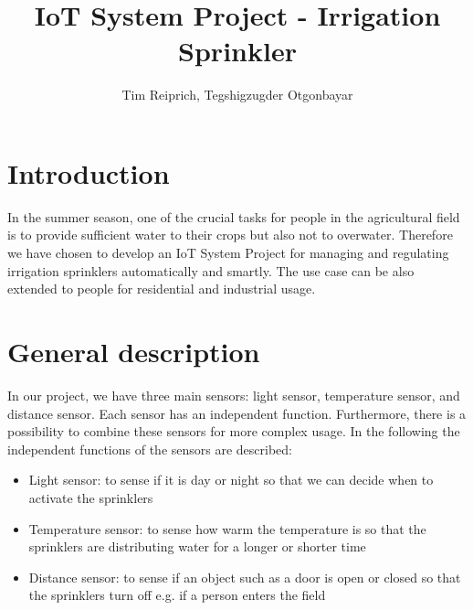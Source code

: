 \documentclass{article}
\title{IoT System Project - Irrigation Sprinkler}
\author{Tim Reiprich, Tegshigzugder Otgonbayar}
\begin{document}
\pagestyle{plain}  %

\maketitle


\newpage

\tableofcontents %
\newpage

\section{Introduction}
In the summer season, one of the crucial tasks for people in the agricultural field is to provide sufficient water to their crops but also not to overwater. Therefore we have chosen to develop an IoT System Project for managing and regulating irrigation sprinklers automatically and smartly. The use case can be also extended to people for residential and industrial usage.

\section{General description}
In our project, we have three main sensors: light sensor, temperature sensor, and distance sensor. Each sensor has an independent function. Furthermore, there is a possibility to combine these sensors for more complex usage.
In the following the independent functions of the sensors are described:
\begin{itemize}
\item Light sensor: to sense if it is day or night so that we can decide when to activate the sprinklers
\item Temperature sensor: to sense how warm the temperature is so that the sprinklers are distributing water for a longer or shorter time
\item Distance sensor: to sense if an object such as a door is open or closed so that the sprinklers turn off e.g. if a person enters the field
\end{itemize}
\end{document}

